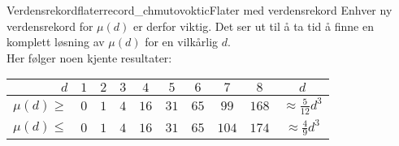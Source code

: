\begin{surferIntroPage}{Verdensrekordflater}{record_chmutovoktic}{Flater med verdensrekord}
  Enhver ny verdensrekord for $\mu(d)$ er derfor viktig. Det ser ut til å ta tid å finne en komplett løsning av $\mu(d)$ for en 
  vilkårlig $d$.\\ Her følger noen kjente resultater:
  
    
   \begin{center}
      \begin{tabular}{r|cccccccc|c}
        $d$ & $1$ & $2$ & $3$ & $4$ & $5$ & $6$ & $7$ & $8$ & $d$\\
        \hline
        \hline
        \rule{0pt}{1.2em}$\mu(d)\ge$ & $0$ & $1$ & $4$ & $16$ & $31$ & $65$ &
        $99$ & $168$ & 
        $\approx \frac{5}{12}d^3$\\[0.3em]
        \hline
        \rule{0pt}{1.2em}$\mu(d)\le$ & $0$ & $1$ & $4$ & $16$ & $31$ & $65$ &
        $104$ & $174$ & $\approx \frac{4}{9}d^3$
      \end{tabular}
    \end{center}
\end{surferIntroPage}
